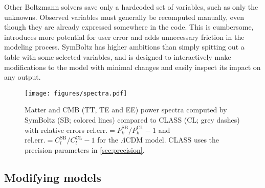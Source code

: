 \documentclass{aa}
\begin{document}
Other Boltzmann solvers save only a hardcoded set of variables, such as only the unknowns.
Observed variables must generally be recomputed manually, even though they are already expressed somewhere in the code.
This is cumbersome, introduces more potential for user error and adds unnecessary friction in the modeling process.
SymBoltz has higher ambitions than simply spitting out a table with some selected variables, and is designed to interactively make modifications to the model with minimal changes and easily inspect its impact on any output.

\begin{figure*}
    \centering
    \texttt{[image: figures/spectra.pdf]}
    \caption{Matter and CMB (TT, TE and EE) power spectra computed by SymBoltz (SB; colored lines) compared to CLASS (CL; grey dashes) with relative errors $\text{rel.err.} = P_k^\text{SB}/P_k^\text{CL}-1$ and $\text{rel.err.} = C_l^\text{SB}/C_l^\text{CL}-1$ for the $\Lambda \text{CDM}$ model. CLASS uses the precision parameters in \cref{sec:precision}.}
    \label{fig:spectra}
\end{figure*}

\subsection{Modifying models}
\label{sec:modifying}
\end{document}

